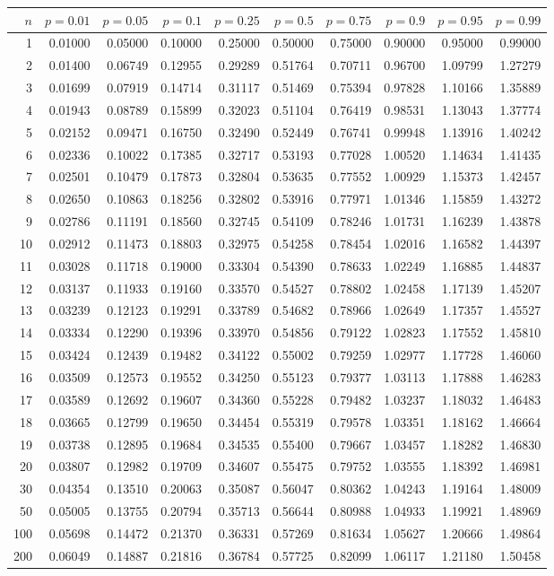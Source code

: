 \begin{table}[h]
\small
\begin{center}
\begin{tabular}{|r|rrr|rrr|rrr|}
\hline
$n$&$p=0.01$&$p=0.05$&$p=0.1$&$p=0.25$&$p=0.5$&$p=0.75$&$p=0.9$&$p=0.95$&$p=0.99$\\
\hline
1&0.01000&0.05000&0.10000&0.25000&0.50000&0.75000&0.90000&0.95000&0.99000\\
2&0.01400&0.06749&0.12955&0.29289&0.51764&0.70711&0.96700&1.09799&1.27279\\
3&0.01699&0.07919&0.14714&0.31117&0.51469&0.75394&0.97828&1.10166&1.35889\\
4&0.01943&0.08789&0.15899&0.32023&0.51104&0.76419&0.98531&1.13043&1.37774\\
5&0.02152&0.09471&0.16750&0.32490&0.52449&0.76741&0.99948&1.13916&1.40242\\
6&0.02336&0.10022&0.17385&0.32717&0.53193&0.77028&1.00520&1.14634&1.41435\\
7&0.02501&0.10479&0.17873&0.32804&0.53635&0.77552&1.00929&1.15373&1.42457\\
8&0.02650&0.10863&0.18256&0.32802&0.53916&0.77971&1.01346&1.15859&1.43272\\
9&0.02786&0.11191&0.18560&0.32745&0.54109&0.78246&1.01731&1.16239&1.43878\\
10&0.02912&0.11473&0.18803&0.32975&0.54258&0.78454&1.02016&1.16582&1.44397\\
11&0.03028&0.11718&0.19000&0.33304&0.54390&0.78633&1.02249&1.16885&1.44837\\
12&0.03137&0.11933&0.19160&0.33570&0.54527&0.78802&1.02458&1.17139&1.45207\\
13&0.03239&0.12123&0.19291&0.33789&0.54682&0.78966&1.02649&1.17357&1.45527\\
14&0.03334&0.12290&0.19396&0.33970&0.54856&0.79122&1.02823&1.17552&1.45810\\
15&0.03424&0.12439&0.19482&0.34122&0.55002&0.79259&1.02977&1.17728&1.46060\\
16&0.03509&0.12573&0.19552&0.34250&0.55123&0.79377&1.03113&1.17888&1.46283\\
17&0.03589&0.12692&0.19607&0.34360&0.55228&0.79482&1.03237&1.18032&1.46483\\
18&0.03665&0.12799&0.19650&0.34454&0.55319&0.79578&1.03351&1.18162&1.46664\\
19&0.03738&0.12895&0.19684&0.34535&0.55400&0.79667&1.03457&1.18282&1.46830\\
20&0.03807&0.12982&0.19709&0.34607&0.55475&0.79752&1.03555&1.18392&1.46981\\
30&0.04354&0.13510&0.20063&0.35087&0.56047&0.80362&1.04243&1.19164&1.48009\\
50&0.05005&0.13755&0.20794&0.35713&0.56644&0.80988&1.04933&1.19921&1.48969\\
100&0.05698&0.14472&0.21370&0.36331&0.57269&0.81634&1.05627&1.20666&1.49864\\
200&0.06049&0.14887&0.21816&0.36784&0.57725&0.82099&1.06117&1.21180&1.50458\\


\end{tabular}
\end{center}
\end{table}

